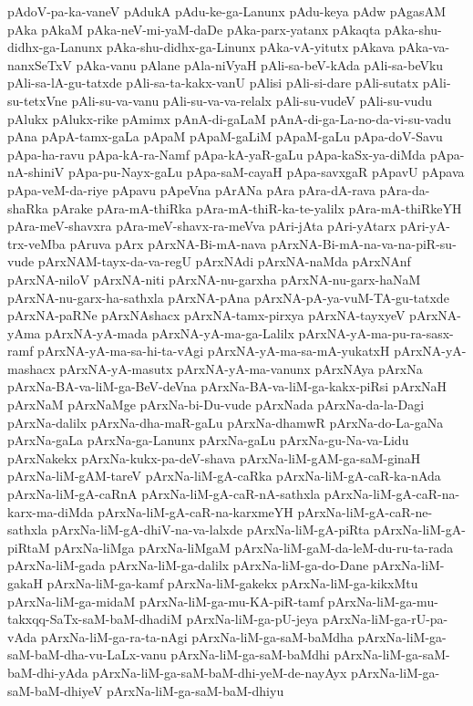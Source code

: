 {pAdoV-pa-ka-vaneV
pAdukA
pAdu-ke-ga-Lanunx
pAdu-keya
pAdw
pAgasAM
pAka
pAkaM
pAka-neV-mi-yaM-daDe
pAka-parx-yatanx
pAkaqta
pAka-shu-didhx-ga-Lanunx
pAka-shu-didhx-ga-Linunx
pAka-vA-yitutx
pAkava
pAka-va-nanxSeTxV
pAka-vanu
pAlane
pAla-niVyaH
pAli-sa-beV-kAda
pAli-sa-beVku
pAli-sa-lA-gu-tatxde
pAli-sa-ta-kakx-vanU
pAlisi
pAli-si-dare
pAli-sutatx
pAli-su-tetxVne
pAli-su-va-vanu
pAli-su-va-va-relalx
pAli-su-vudeV
pAli-su-vudu
pAlukx
pAlukx-rike
pAmimx
pAnA-di-gaLaM
pAnA-di-ga-La-no-da-vi-su-vadu
pAna
pApA-tamx-gaLa
pApaM
pApaM-gaLiM
pApaM-gaLu
pApa-doV-Savu
pApa-ha-ravu
pApa-kA-ra-Namf
pApa-kA-yaR-gaLu
pApa-kaSx-ya-diMda
pApa-nA-shiniV
pApa-pu-Nayx-gaLu
pApa-saM-cayaH
pApa-savxgaR
pApavU
pApava
pApa-veM-da-riye
pApavu
pApeVna
pArANa
pAra
pAra-dA-rava
pAra-da-shaRka
pArake
pAra-mA-thiRka
pAra-mA-thiR-ka-te-yalilx
pAra-mA-thiRkeYH
pAra-meV-shavxra
pAra-meV-shavx-ra-meVva
pAri-jAta
pAri-yAtarx
pAri-yA-trx-veMba
pAruva
pArx
pArxNA-Bi-mA-nava
pArxNA-Bi-mA-na-va-na-piR-su-vude
pArxNAM-tayx-da-va-regU
pArxNAdi
pArxNA-naMda
pArxNAnf
pArxNA-niloV
pArxNA-niti
pArxNA-nu-garxha
pArxNA-nu-garx-haNaM
pArxNA-nu-garx-ha-sathxla
pArxNA-pAna
pArxNA-pA-ya-vuM-TA-gu-tatxde
pArxNA-paRNe
pArxNAshacx
pArxNA-tamx-pirxya
pArxNA-tayxyeV
pArxNA-yAma
pArxNA-yA-mada
pArxNA-yA-ma-ga-Lalilx
pArxNA-yA-ma-pu-ra-sasx-ramf
pArxNA-yA-ma-sa-hi-ta-vAgi
pArxNA-yA-ma-sa-mA-yukatxH
pArxNA-yA-mashacx
pArxNA-yA-masutx
pArxNA-yA-ma-vanunx
pArxNAya
pArxNa
pArxNa-BA-va-liM-ga-BeV-deVna
pArxNa-BA-va-liM-ga-kakx-piRsi
pArxNaH
pArxNaM
pArxNaMge
pArxNa-bi-Du-vude
pArxNada
pArxNa-da-la-Dagi
pArxNa-dalilx
pArxNa-dha-maR-gaLu
pArxNa-dhamwR
pArxNa-do-La-gaNa
pArxNa-gaLa
pArxNa-ga-Lanunx
pArxNa-gaLu
pArxNa-gu-Na-va-Lidu
pArxNakekx
pArxNa-kukx-pa-deV-shava
pArxNa-liM-gAM-ga-saM-ginaH
pArxNa-liM-gAM-tareV
pArxNa-liM-gA-caRka
pArxNa-liM-gA-caR-ka-nAda
pArxNa-liM-gA-caRnA
pArxNa-liM-gA-caR-nA-sathxla
pArxNa-liM-gA-caR-na-karx-ma-diMda
pArxNa-liM-gA-caR-na-karxmeYH
pArxNa-liM-gA-caR-ne-sathxla
pArxNa-liM-gA-dhiV-na-va-lalxde
pArxNa-liM-gA-piRta
pArxNa-liM-gA-piRtaM
pArxNa-liMga
pArxNa-liMgaM
pArxNa-liM-gaM-da-leM-du-ru-ta-rada
pArxNa-liM-gada
pArxNa-liM-ga-dalilx
pArxNa-liM-ga-do-Dane
pArxNa-liM-gakaH
pArxNa-liM-ga-kamf
pArxNa-liM-gakekx
pArxNa-liM-ga-kikxMtu
pArxNa-liM-ga-midaM
pArxNa-liM-ga-mu-KA-piR-tamf
pArxNa-liM-ga-mu-takxqq-SaTx-saM-baM-dhadiM
pArxNa-liM-ga-pU-jeya
pArxNa-liM-ga-rU-pa-vAda
pArxNa-liM-ga-ra-ta-nAgi
pArxNa-liM-ga-saM-baMdha
pArxNa-liM-ga-saM-baM-dha-vu-LaLx-vanu
pArxNa-liM-ga-saM-baMdhi
pArxNa-liM-ga-saM-baM-dhi-yAda
pArxNa-liM-ga-saM-baM-dhi-yeM-de-nayAyx
pArxNa-liM-ga-saM-baM-dhiyeV
pArxNa-liM-ga-saM-baM-dhiyu
}
